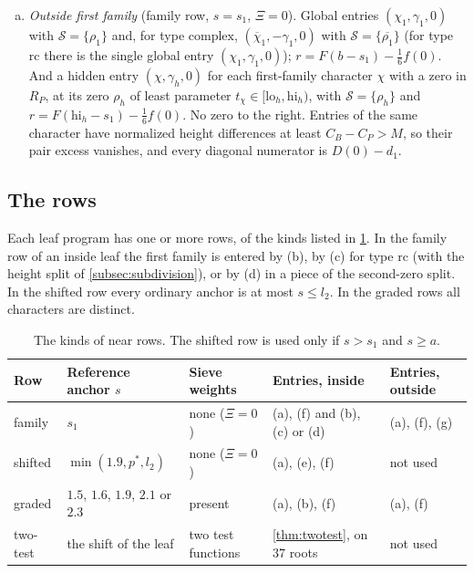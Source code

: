 \documentclass[11pt]{amsart}
\numberwithin{equation}{section}
\theoremstyle{plain}
\theoremstyle{definition}
\theoremstyle{remark}
\newcommand{\cS}{\mathcal{S}}
\newcommand{\lo}{\mathrm{lo}}
\newcommand{\hi}{\mathrm{hi}}
\newcommand{\1}{\mathbf{1}}
\newcommand{\bchi}{\overline{\chi}}
\begin{document}
\begin{enumerate}[(a)]
    second-family columns, the column $[\lo_{2,j},\hi_{2,j}]$ uses $\sigma=\min(\max(a,\min(l_2,\lo_{2,j})),s)$,
    $r=F(\hi_{2,j}-\sigma)-\frac16f(0)$ and the diagonal numerator $D(s-\sigma)-d_1$.
  \item \emph{Outside first family} (family row, $s=s_1$, $\Xi=0$). Global entries $(\chi_1,\gamma_1,0)$ with
    $\cS=\{\rho_1\}$ and, for type $\mathrm{complex}$, $(\bchi_1,-\gamma_1,0)$ with $\cS=\{\overline{\rho_1}\}$ (for
    type $\mathrm{rc}$ there is the single global entry $(\chi_1,\gamma_1,0)$); $r=F(b-s_1)-\frac16f(0)$. And a
    hidden entry $(\chi,\gamma_h,0)$ for each first-family character $\chi$ with a zero in $R_P$, at its zero
    $\rho_h$ of least parameter $t_\chi\in[\lo_h,\hi_h)$, with $\cS=\{\rho_h\}$ and $r=F(\hi_h-s_1)-\frac16f(0)$.
    No zero to the right. Entries of the same character have normalized height differences at least
    $C_B-C_P>M$, so their pair excess vanishes, and every diagonal numerator is $D(0)-d_1$.
\end{enumerate}

\subsection{The rows}\label{subsec:rowkinds}
Each leaf program has one or more rows, of the kinds listed in \cref{tab:rowkinds}. In the family
row of an inside leaf the first family is entered by (b), by (c) for type $\mathrm{rc}$ (with the
height split of \cref{subsec:subdivision}), or by (d) in a piece of the second-zero split. In the
shifted row every ordinary anchor is at most $s\le l_2$. In the graded rows all characters are
distinct.

\begin{table}[ht]
\centering
\small
\begin{tabular}{@{}lllll@{}}
\toprule
Row & Reference anchor $s$ & Sieve weights & Entries, inside & Entries, outside\\
\midrule
family & $s_1$ & none ($\Xi=0$) & (a), (f) and (b), (c) or (d) & (a), (f), (g)\\
shifted & $\min(1.9,p^*,l_2)$ & none ($\Xi=0$) & (a), (e), (f) & not used\\
graded & $1.5$, $1.6$, $1.9$, $2.1$ or $2.3$ & present & (a), (b), (f) & (a), (f)\\
two-test & the shift of the leaf & two test functions & \cref{thm:twotest}, on $37$ roots & not used\\
\bottomrule
\end{tabular}
\caption{The kinds of near rows. The shifted row is used only if $s>s_1$ and $s\ge a$.}
\label{tab:rowkinds}
\end{table}
\end{document}
